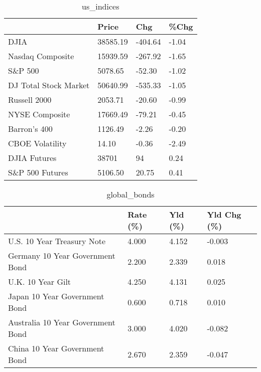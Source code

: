 \documentclass{article}%
\begin{document}
%


\begin{table}[htbp]%
\caption{us\_indices}%
\centering%
\begin{adjustbox}{width=1\textwidth}%
\begin{tabular}{llll}
\toprule
                      &    Price &     Chg &  \%Chg \\
\midrule
                 DJIA & 38585.19 & -404.64 & -1.04 \\
     Nasdaq Composite & 15939.59 & -267.92 & -1.65 \\
              S\&P 500 &  5078.65 &  -52.30 & -1.02 \\
DJ Total Stock Market & 50640.99 & -535.33 & -1.05 \\
         Russell 2000 &  2053.71 &  -20.60 & -0.99 \\
       NYSE Composite & 17669.49 &  -79.21 & -0.45 \\
         Barron's 400 &  1126.49 &   -2.26 & -0.20 \\
      CBOE Volatility &    14.10 &   -0.36 & -2.49 \\
         DJIA Futures &    38701 &      94 &  0.24 \\
      S\&P 500 Futures &  5106.50 &   20.75 &  0.41 \\
\bottomrule
\end{tabular}
%
\end{adjustbox}%
\end{table}

%


\begin{table}[htbp]%
\caption{global\_bonds}%
\centering%
\begin{adjustbox}{width=1\textwidth}%
\begin{tabular}{llll}
\toprule
                                  & Rate (\%) & Yld (\%) & Yld Chg (\%) \\
\midrule
       U.S. 10 Year Treasury Note &    4.000 &   4.152 &      -0.003 \\
  Germany 10 Year Government Bond &    2.200 &   2.339 &       0.018 \\
                U.K. 10 Year Gilt &    4.250 &   4.131 &       0.025 \\
    Japan 10 Year Government Bond &    0.600 &   0.718 &       0.010 \\
Australia 10 Year Government Bond &    3.000 &   4.020 &      -0.082 \\
    China 10 Year Government Bond &    2.670 &   2.359 &      -0.047 \\
\bottomrule
\end{tabular}
%
\end{adjustbox}%
\end{table}
\end{document}
